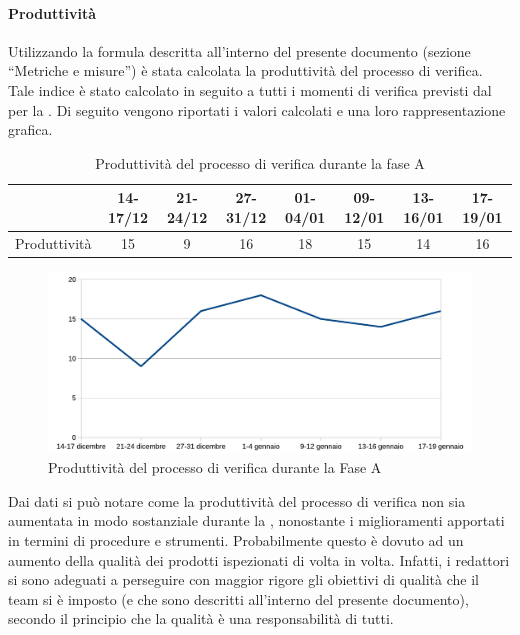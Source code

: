 			\paragraph{Produttività}
				Utilizzando la formula descritta all'interno del presente documento (sezione “Metriche e misure”) è stata calcolata la produttività del 
				processo di verifica. Tale indice è stato calcolato in seguito a tutti i momenti di verifica previsti dal  per 
				la . Di seguito vengono riportati i valori calcolati e una loro rappresentazione grafica.
				\begin{table}[H]
					\centering
						\begin{tabu}{| l | c | c | c | c | c | c | c |}
							\hline
								&14-17/12	&21-24/12	&27-31/12 	&01-04/01	&09-12/01	&13-16/01	&17-19/01	\\ \hline
							Produttività	&15	&9	&16	&18	&15	&14	&16\\ \hline
						\end{tabu}
					\caption{Produttività del processo di verifica durante la fase A}
				\end{table}
				\begin{figure}[H]
					\centering
					\includegraphics[width=12cm]{PianoDiQualifica/Pics/ProduttivitaVerificaFaseA.pdf}
					\caption{Produttività del processo di verifica durante la Fase A}
				\end{figure}
				Dai dati si può notare come la produttività del processo di verifica non sia aumentata in modo sostanziale durante la , nonostante 
				i miglioramenti apportati in termini di procedure e strumenti. Probabilmente questo è dovuto ad un aumento della qualità dei prodotti 
				ispezionati di volta in volta. Infatti, i redattori si sono adeguati a perseguire con maggior rigore gli obiettivi di qualità che il team 
				si è imposto (e che sono descritti all'interno del presente documento), secondo il principio che la qualità è una responsabilità di tutti.
